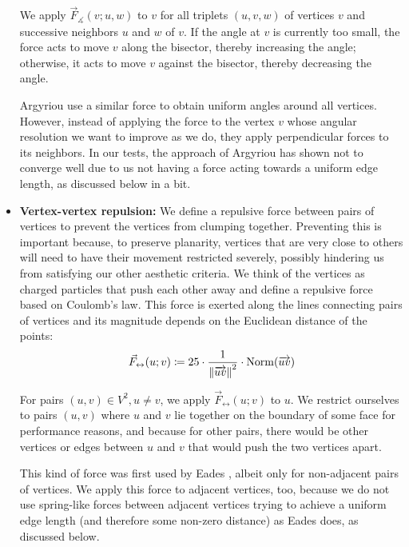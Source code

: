 \begin{itemize}
We apply $\vec{F}_\measuredangle(v;u,w)$ to $v$ for all triplets $(u,v,w)$ of vertices $v$ and successive neighbors $u$ and $w$ of $v$.
If the angle at $v$ is currently too small, the force acts to move $v$ along the bisector, thereby increasing the angle; otherwise, it acts to move $v$ against the bisector, thereby decreasing the angle.

Argyriou \etal{} \cite{argyriou2013maximizing} use a similar force to obtain uniform angles around all vertices.
However, instead of applying the force to the vertex $v$ whose angular resolution we want to improve as we do, they apply perpendicular forces to its neighbors.
In our tests, the approach of Argyriou \etal{} has shown not to converge well due to us not having a force acting towards a uniform edge length, as discussed below in a bit.


\item \textbf{Vertex-vertex repulsion:} %
We define a repulsive force between pairs of vertices to prevent the vertices from clumping together.
Preventing this is important because, to preserve planarity, vertices that are very close to others will need to have their movement restricted severely, possibly hindering us from satisfying our other aesthetic criteria.
We think of the vertices as charged particles that push each other away and define a repulsive force based on Coulomb's law.
This force is exerted along the lines connecting pairs of vertices and its magnitude depends on the Euclidean distance of the points:
%
\begin{equation}
	\vec{F}_\leftrightarrow(u;v) \coloneqq
	25 \cdot \frac{1}{\left\lVert\overrightarrow{uv}\right\rVert^2}
	\cdot \operatorname{Norm}(\overrightarrow{uv})
\end{equation}

For pairs $(u, v) \in V^2, u \neq v$, we apply $\vec{F}_\leftrightarrow(u;v)$ to $u$.
We restrict ourselves to pairs $(u,v)$ where $u$ and $v$ lie together on the boundary of some face for performance reasons, and because for other pairs, there would be other vertices or edges between $u$ and $v$ that would push the two vertices apart.

This kind of force was first used by Eades \cite{eades84heuristic}, albeit only for non-adjacent pairs of vertices.
We apply this force to adjacent vertices, too, because we do not use spring-like forces between adjacent vertices trying to achieve a uniform edge length (and therefore some non-zero distance) as Eades does, as discussed below.



\end{itemize}
